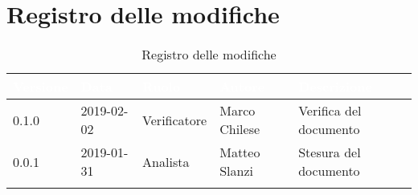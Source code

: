\newpage

\section{Registro delle modifiche}

\begin{center}
\begin{longtable}[c]{|m{}|m{}|m{}|m{}|p{}|}
\hline
\rowcolor{bluelogo}\textbf{\textcolor{white}{Versione}} & \textbf{\textcolor{white}{Data}} & \textbf{\textcolor{white}{Ruolo}} & \textbf{\textcolor{white}{Autore}} & \textbf{\textcolor{white}{Descrizione}}\\
\hline 
\endfirsthead
\rowcolor{grigio} 0.1.0 & 2019-02-02 & Verificatore & Marco Chilese & Verifica del documento \\
0.0.1 & 2019-01-31 & Analista & Matteo Slanzi & Stesura del documento \\
\hline
\caption{Registro delle modifiche}
\end{longtable}
\end{center}
